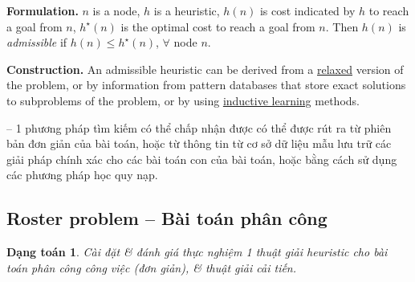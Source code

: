 \documentclass{article}
\newtheorem{dangtoan}{Dạng toán}
\begin{document}
{\bf Formulation.} $n$ is a node, $h$ is a heuristic, $h(n)$ is cost indicated by $h$ to reach a goal from $n$, $h^\star(n)$ is the optimal cost to reach a goal from $n$. Then $h(n)$ is {\it admissible} if $h(n)\le h^\star(n)$, $\forall$ node $n$.

{\bf Construction.} An admissible heuristic can be derived from a \href{https://en.wikipedia.org/wiki/Relaxation_(approximation)}{relaxed} version of the problem, or by information from pattern databases that store exact solutions to subproblems of the problem, or by using \href{https://en.wikipedia.org/wiki/Inductive_transfer}{inductive learning} methods.

-- 1 phương pháp tìm kiếm có thể chấp nhận được có thể được rút ra từ phiên bản đơn giản của bài toán, hoặc từ thông tin từ cơ sở dữ liệu mẫu lưu trữ các giải pháp chính xác cho các bài toán con của bài toán, hoặc bằng cách sử dụng các phương pháp học quy nạp.


\subsection{Roster problem -- Bài toán phân công}

\begin{dangtoan}
	Cài đặt \& đánh giá thực nghiệm 1 thuật giải heuristic cho bài toán phân công công việc (đơn giản), \& thuật giải cải tiến.
\end{dangtoan}
\end{document}

